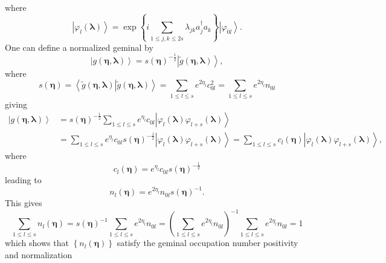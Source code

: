 \documentclass[aps,preprint]{revtex4}%
\begin{document}
where
\begin{equation}
\left\vert \varphi_{l}\left(  \mathbf{\lambda}\right)  \right\rangle
=\exp\left\{  i\sum_{1\leq j,k\leq2s}\lambda_{jk}a_{j}^{\dagger}a_{k}\right\}
\left\vert \varphi_{0l}\right\rangle .
\end{equation}
One can define a normalized geminal by
\begin{equation}
\left\vert g\left(  \mathbf{\eta},\mathbf{\lambda}\right)  \right\rangle
=\mathit{s}\left(  \mathbf{\eta}\right)  ^{-\frac{1}{2}}\left\vert \tilde
{g}\left(  \mathbf{\eta},\mathbf{\lambda}\right)  \right\rangle ,
\end{equation}
where
\begin{equation}
\mathit{s}\left(  \mathbf{\eta}\right)  =\left\langle \left.  \tilde{g}\left(
\mathbf{\eta},\mathbf{\lambda}\right)  \right\vert \tilde{g}\left(
\mathbf{\eta},\mathbf{\lambda}\right)  \right\rangle =\sum_{1\leq l\leq
s}e^{2\eta_{l}}c_{0l}^{2}=\sum_{1\leq l\leq s}e^{2\eta_{l}}n_{0l}%
\end{equation}
giving
\begin{align}
\left\vert g\left(  \mathbf{\eta},\mathbf{\lambda}\right)  \right\rangle  &
=\mathit{s}\left(  \mathbf{\eta}\right)  ^{-\frac{1}{2}}\sum_{1\leq l\leq
s}e^{\eta_{l}}c_{0l}\left\vert \varphi_{l}\left(  \mathbf{\lambda}\right)
\varphi_{l+s}\left(  \mathbf{\lambda}\right)  \right\rangle \\
&  =\sum_{1\leq l\leq s}e^{\eta_{l}}c_{0l}\mathit{s}\left(  \mathbf{\eta
}\right)  ^{-\frac{1}{2}}\left\vert \varphi_{l}\left(  \mathbf{\lambda
}\right)  \varphi_{l+s}\left(  \mathbf{\lambda}\right)  \right\rangle
=\sum_{1\leq l\leq s}c_{l}\left(  \mathbf{\eta}\right)  \left\vert \varphi
_{l}\left(  \mathbf{\lambda}\right)  \varphi_{l+s}\left(  \mathbf{\lambda
}\right)  \right\rangle ,
\end{align}
where
\[
c_{l}\left(  \mathbf{\eta}\right)  =e^{\eta_{l}}c_{0l}\mathit{s}\left(
\mathbf{\eta}\right)  ^{-\frac{1}{2}}%
\]
leading to
\[
n_{l}\left(  \mathbf{\eta}\right)  =e^{2\eta_{l}}n_{0l}\mathit{s}\left(
\mathbf{\eta}\right)  ^{-1}.
\]
This gives
\begin{equation}
\sum_{1\leq l\leq s}n_{l}\left(  \mathbf{\eta}\right)  =\mathit{s}\left(
\mathbf{\eta}\right)  ^{-1}\sum_{1\leq l\leq s}e^{2\eta_{l}}n_{0l}=\left(
\sum_{1\leq l\leq s}e^{2\eta_{l}}n_{0l}\right)  ^{-1}\sum_{1\leq l\leq
s}e^{2\eta_{l}}n_{0l}=1
\end{equation}
which shows that $\left\{  n_{l}\left(  \mathbf{\eta}\right)  \right\}  $
satisfy the geminal occupation number positivity and normalization
\end{document}
